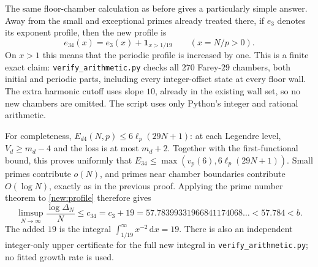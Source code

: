 \documentclass[11pt]{article}
\newcommand{\dd}{\mathrm d}
\begin{document}
The same floor-chamber calculation as before gives a particularly simple
answer. Away from the small and exceptional primes already treated there,
if $e_3$ denotes its exponent profile, then the new profile is
\begin{equation}\label{new:profile}
 e_{34}(x)=e_3(x)+\mathbf1_{x>1/19}\qquad(x=N/p>0).
\end{equation}
On $x>1$ this means that the periodic profile is increased by one.
This is a finite exact claim: \texttt{verify\_arithmetic.py} checks all $270$
Farey-$29$ chambers, both initial and periodic parts, including every
integer-offset state at every floor wall. The extra harmonic cutoff uses
slope $10$, already in the existing wall set, so no new chambers are omitted.
The script uses only Python's integer and rational arithmetic.

For completeness, $E_{d4}(N,p)\le6\ell_p(29N+1)$: at each Legendre level,
$V_d\ge m_d-4$ and the loss is at most $m_d+2$.
Together with the first-functional bound, this proves uniformly that
$E_{34}\le\max(v_p(6),6\ell_p(29N+1))$. Small primes contribute $o(N)$,
and primes near chamber boundaries contribute $O(\log N)$, exactly as in
the previous proof. Applying the prime number theorem to \eqref{new:profile}
therefore gives
\begin{equation}\label{new:rate}
 \limsup_{N\to\infty}\frac{\log\Delta_N}{N}
 \le c_{34}=c_3+19
 =57.78399331966841174068\ldots<57.784<b.
\end{equation}
The added $19$ is the integral
$\int_{1/19}^{\infty}x^{-2}\,\dd x=19$.
There is also an independent integer-only upper certificate for the full
new integral in \texttt{verify\_arithmetic.py}; no fitted growth rate is used.
\end{document}
